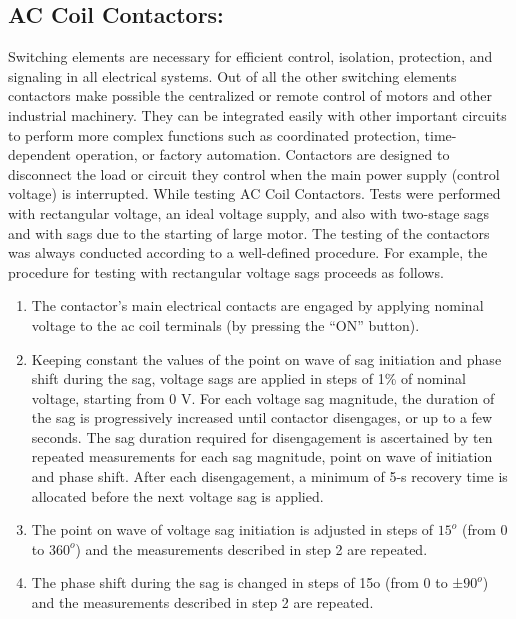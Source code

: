 \documentclass[17pt, a4paper]{extreport}
\begin{document}
\begin{enumerate}
 \subsection{AC Coil Contactors:} Switching elements are necessary for efficient control, isolation, protection, and signaling in all electrical systems. Out of all the other switching elements contactors make possible the centralized or remote control of motors and other industrial machinery. They can be integrated easily with other important circuits to perform more complex functions such as coordinated protection, time-dependent operation, or factory automation. Contactors are designed to disconnect the load or circuit they control when the main power supply (control voltage) is interrupted. While testing AC Coil Contactors. Tests were performed with rectangular voltage, an ideal voltage supply, and also with two-stage sags and with sags due to the starting of large motor. The testing of the contactors was always conducted according to a well-defined procedure. For example, the procedure for testing with rectangular voltage sags proceeds as follows.
 \begin{enumerate}
     \item The contactor’s main electrical contacts are engaged by applying nominal voltage to the ac coil terminals (by pressing
the “ON” button).

\item Keeping constant the values of the point on wave of sag initiation and phase shift during the sag, voltage sags are applied in steps of 1\% of nominal voltage, starting from 0 V. For each voltage sag magnitude, the duration of the sag is progressively increased until contactor disengages, or up to a few seconds. The sag duration required for disengagement is ascertained by ten repeated measurements for each sag magnitude, point on wave of initiation and phase shift. After each disengagement, a minimum of 5-s recovery time is allocated before the next voltage sag is applied. 

\item The point on wave of voltage sag initiation is adjusted in steps of $15^{o}$ (from 0 to $360^{o}$) and the measurements described
in step 2 are repeated.

\item The phase shift during the sag is changed in steps of 15o (from 0 to ±$90^{o}$) and the measurements described in step 2 are
repeated. 




 \end{enumerate}
 

\end{enumerate}
\end{document}
